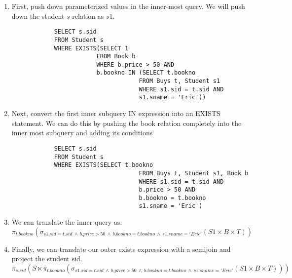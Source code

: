 \documentclass{article}
\begin{document}
\begin{enumerate}
\begin{enumerate}
\begin{enumerate}
\begin{lstlisting}
            \end{lstlisting}

            \item First, push down parameterized values in the inner-most query. We will push down the student $s$ relation as $s1$.
            \begin{lstlisting}
            SELECT s.sid
            FROM Student s
            WHERE EXISTS(SELECT 1
                        FROM Book b
                        WHERE b.price > 50 AND
                        b.bookno IN (SELECT t.bookno
                                    FROM Buys t, Student s1
                                    WHERE s1.sid = t.sid AND
                                    s1.sname = 'Eric'))

            \end{lstlisting}

            \item Next, convert the first inner subquery IN expression into an EXISTS statement. We can do this by pushing the book relation completely into the inner most subquery and adding its conditions
            \begin{lstlisting}
            SELECT s.sid
            FROM Student s
            WHERE EXISTS(SELECT t.bookno
                                    FROM Buys t, Student s1, Book b
                                    WHERE s1.sid = t.sid AND
                                    b.price > 50 AND
                                    b.bookno = t.bookno
                                    s1.sname = 'Eric')

            \end{lstlisting}

            \item We can translate the inner query as:
            \begin{displaymath}
                \pi_{t.bookno}(\sigma_{s1.sid=t.sid\ \wedge\ b.price > 50\ \wedge\ b.bookno = t.bookno\ \wedge\ s1.sname='Eric'}(S1 \times B \times T))
            \end{displaymath}

            \item Finally, we can translate our outer exists expression with a semijoin and project the student sid.
            \begin{displaymath}
                \pi_{s.sid}(S \ltimes
                \pi_{t.bookno}(\sigma_{s1.sid=t.sid\ \wedge\ b.price > 50\ \wedge\ b.bookno = t.bookno\ \wedge\ s1.sname='Eric'}(S1 \times B \times T)))
            \end{displaymath}


\end{enumerate}
\end{enumerate}
\end{enumerate}
\end{document}

